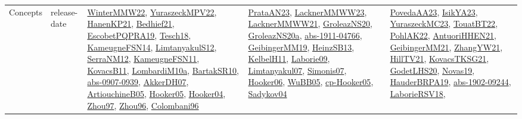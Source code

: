 {\begin{longtable}{lp{3cm}>{\raggedright}p{6cm}>{\raggedright}p{6cm}p{8cm}}
Concepts & release-date & \href{papers/WinterMMW22.pdf}{WinterMMW22}\cite{WinterMMW22}, \href{articles/YuraszeckMPV22.pdf}{YuraszeckMPV22}\cite{YuraszeckMPV22}, \href{papers/HanenKP21.pdf}{HanenKP21}\cite{HanenKP21}, \href{articles/Bedhief21.pdf}{Bedhief21}\cite{Bedhief21}, \href{articles/EscobetPQPRA19.pdf}{EscobetPQPRA19}\cite{EscobetPQPRA19}, \href{papers/Tesch18.pdf}{Tesch18}\cite{Tesch18}, \href{articles/KameugneFSN14.pdf}{KameugneFSN14}\cite{KameugneFSN14}, \href{articles/LimtanyakulS12.pdf}{LimtanyakulS12}\cite{LimtanyakulS12}, \href{papers/SerraNM12.pdf}{SerraNM12}\cite{SerraNM12}, \href{papers/KameugneFSN11.pdf}{KameugneFSN11}\cite{KameugneFSN11}, \href{articles/KovacsB11.pdf}{KovacsB11}\cite{KovacsB11}, \href{articles/LombardiM10a.pdf}{LombardiM10a}\cite{LombardiM10a}, \href{articles/BartakSR10.pdf}{BartakSR10}\cite{BartakSR10}, \href{articles/abs-0907-0939.pdf}{abs-0907-0939}\cite{abs-0907-0939}, \href{papers/AkkerDH07.pdf}{AkkerDH07}\cite{AkkerDH07}, \href{papers/ArtiouchineB05.pdf}{ArtiouchineB05}\cite{ArtiouchineB05}, \href{articles/Hooker05.pdf}{Hooker05}\cite{Hooker05}, \href{papers/Hooker04.pdf}{Hooker04}\cite{Hooker04}, \href{articles/Zhou97.pdf}{Zhou97}\cite{Zhou97}, \href{papers/Zhou96.pdf}{Zhou96}\cite{Zhou96}, \href{papers/Colombani96.pdf}{Colombani96}\cite{Colombani96} & \href{articles/PrataAN23.pdf}{PrataAN23}\cite{PrataAN23}, \href{articles/LacknerMMWW23.pdf}{LacknerMMWW23}\cite{LacknerMMWW23}, \href{papers/LacknerMMWW21.pdf}{LacknerMMWW21}\cite{LacknerMMWW21}, \href{papers/GroleazNS20.pdf}{GroleazNS20}\cite{GroleazNS20}, \href{papers/GroleazNS20a.pdf}{GroleazNS20a}\cite{GroleazNS20a}, \href{articles/abs-1911-04766.pdf}{abs-1911-04766}\cite{abs-1911-04766}, \href{papers/GeibingerMM19.pdf}{GeibingerMM19}\cite{GeibingerMM19}, \href{articles/HeinzSB13.pdf}{HeinzSB13}\cite{HeinzSB13}, \href{articles/KelbelH11.pdf}{KelbelH11}\cite{KelbelH11}, \href{papers/Laborie09.pdf}{Laborie09}\cite{Laborie09}, \href{papers/Limtanyakul07.pdf}{Limtanyakul07}\cite{Limtanyakul07}, \href{articles/Simonis07.pdf}{Simonis07}\cite{Simonis07}, \href{articles/Hooker06.pdf}{Hooker06}\cite{Hooker06}, \href{papers/WuBB05.pdf}{WuBB05}\cite{WuBB05}, \href{papers/cp-Hooker05.pdf}{cp-Hooker05}\cite{cp-Hooker05}, \href{papers/Sadykov04.pdf}{Sadykov04}\cite{Sadykov04} & \href{papers/PovedaAA23.pdf}{PovedaAA23}\cite{PovedaAA23}, \href{articles/IsikYA23.pdf}{IsikYA23}\cite{IsikYA23}, \href{papers/YuraszeckMC23.pdf}{YuraszeckMC23}\cite{YuraszeckMC23}, \href{papers/TouatBT22.pdf}{TouatBT22}\cite{TouatBT22}, \href{articles/PohlAK22.pdf}{PohlAK22}\cite{PohlAK22}, \href{papers/AntuoriHHEN21.pdf}{AntuoriHHEN21}\cite{AntuoriHHEN21}, \href{papers/GeibingerMM21.pdf}{GeibingerMM21}\cite{GeibingerMM21}, \href{articles/ZhangYW21.pdf}{ZhangYW21}\cite{ZhangYW21}, \href{papers/HillTV21.pdf}{HillTV21}\cite{HillTV21}, \href{papers/KovacsTKSG21.pdf}{KovacsTKSG21}\cite{KovacsTKSG21}, \href{papers/GodetLHS20.pdf}{GodetLHS20}\cite{GodetLHS20}, \href{articles/Novas19.pdf}{Novas19}\cite{Novas19}, \href{articles/HauderBRPA19.pdf}{HauderBRPA19}\cite{HauderBRPA19}, \href{articles/abs-1902-09244.pdf}{abs-1902-09244}\cite{abs-1902-09244}, \href{articles/LaborieRSV18.pdf}{LaborieRSV18}\cite{LaborieRSV18}, 
\end{longtable}}
